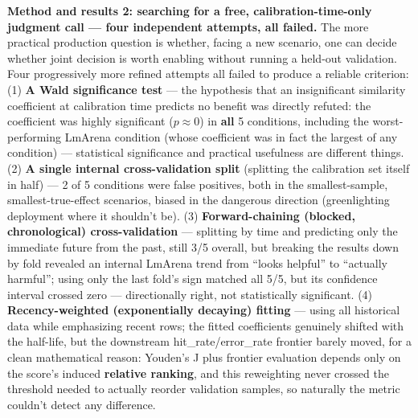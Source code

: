 \documentclass[11pt]{article}
\begin{document}
\textbf{Method and results 2: searching for a free, calibration-time-only judgment call --- four independent attempts, all failed.} The more practical production question is whether, facing a new scenario, one can decide whether joint decision is worth enabling without running a held-out validation. Four progressively more refined attempts all failed to produce a reliable criterion: (1) \textbf{A Wald significance test} --- the hypothesis that an insignificant similarity coefficient at calibration time predicts no benefit was directly refuted: the coefficient was highly significant ($p\approx 0$) in \textbf{all} 5 conditions, including the worst-performing LmArena condition (whose coefficient was in fact the largest of any condition) --- statistical significance and practical usefulness are different things. (2) \textbf{A single internal cross-validation split} (splitting the calibration set itself in half) --- 2 of 5 conditions were false positives, both in the smallest-sample, smallest-true-effect scenarios, biased in the dangerous direction (greenlighting deployment where it shouldn't be). (3) \textbf{Forward-chaining (blocked, chronological) cross-validation} --- splitting by time and predicting only the immediate future from the past, still 3/5 overall, but breaking the results down by fold revealed an internal LmArena trend from ``looks helpful'' to ``actually harmful''; using only the last fold's sign matched all 5/5, but its confidence interval crossed zero --- directionally right, not statistically significant. (4) \textbf{Recency-weighted (exponentially decaying) fitting} --- using all historical data while emphasizing recent rows; the fitted coefficients genuinely shifted with the half-life, but the downstream hit\_rate/error\_rate frontier barely moved, for a clean mathematical reason: Youden's J plus frontier evaluation depends only on the score's induced \textbf{relative ranking}, and this reweighting never crossed the threshold needed to actually reorder validation samples, so naturally the metric couldn't detect any difference.
\end{document}
